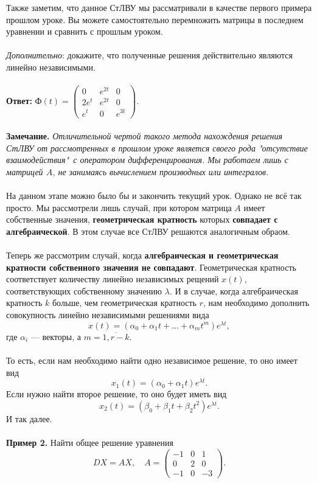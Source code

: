 \documentclass[a4paper, 12pt]{article}
\newcommand{\FI}{\text{Ф}}
\begin{document}
Также заметим, что данное СтЛВУ мы рассматривали в качестве первого примера прошлом уроке. Вы можете самостоятельно перемножить матрицы в последнем уравнении и сравнить с прошлым уроком.\\\\
\textit{Дополнительно}: докажите, что полученные решения действительно являются линейно независимыми.\\\\
\textbf{Ответ:} $\FI(t) = \begin{pmatrix}
	0 & e^{2t} & 0\\
	2e^t & e^{2t} & 0\\
	e^t & 0 & e^{3t}
\end{pmatrix}.$\\\\
\textbf{Замечание.} \textit{Отличительной чертой такого метода нахождения решения СтЛВУ от рассмотренных в прошлом уроке является своего рода "отсутствие взаимодействия"\ с оператором дифференцирования. Мы работаем лишь с матрицей $A$, не занимаясь вычислением производных или интегралов.}\\\\
На данном этапе можно было бы и закончить текущий урок. Однако не всё так просто. Мы рассмотрели лишь случай, при котором матрица $A$ имеет собственные значения, \textbf{геометрическая кратность} которых \textbf{совпадает с алгебраической}. В этом случае все СтЛВУ решаются аналогичным обраом.\\\\ Теперь же рассмотрим случай, когда \textbf{алгебраическая и геометрическая кратности собственного значения не совпадают}. Геометрическая кратность соответствует количеству линейно независимых рещений $x(t)$, соответствующих собственному значению $\lambda$. И в случае, когда алгебраическая кратность $k$ больше, чем геометрическая кратность $r$, нам необходимо дополнить совокупность линейно независимыми решениями вида $$x(t) = (\alpha_0 + \alpha_1t + \ldots + \alpha_mt^m)e^{\lambda t},$$ где $\alpha_i$ --- векторы, а $m = \overline{1,r - k}$.\\\\
То есть, если нам необходимо найти одно независимое решение, то оно имеет вид $$x_1(t) = (\alpha_0 + \alpha_1t)e^{\lambda t}.$$
Если нужно найти второе решение, то оно будет иметь вид
$$x_2(t) = (\beta_0 + \beta_1t + \beta_2t^2)e^{\lambda t}.$$
И так далее.\\\\
\textbf{Пример 2.} Найти общее решение уравнения $$DX = AX, \quad A = \begin{pmatrix}
	-1 & 0 & 1\\
	0 & 2 & 0\\
	-1 & 0 & -3
\end{pmatrix}.$$
\end{document}
